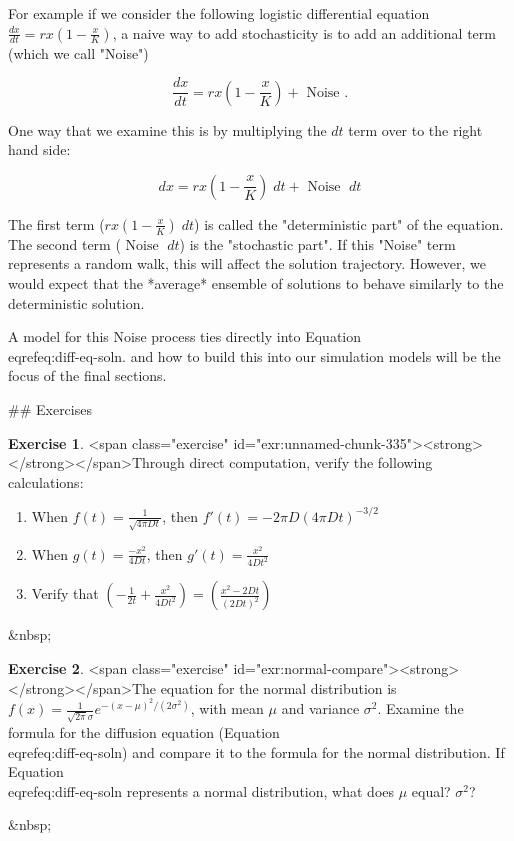 \documentclass[
]{book}
\theoremstyle{definition}
\theoremstyle{definition}
\theoremstyle{definition}
\newtheorem{exercise}{Exercise}[chapter]
\theoremstyle{remark}
\begin{document}
For example if we consider the following logistic differential equation $\displaystyle \frac{dx}{dt} = rx \left(1-\frac{x}{K} \right)$, a naive way to add stochasticity is to add an additional term (which we call "Noise")

\begin{equation}
\frac{dx}{dt} = rx \left(1-\frac{x}{K} \right) + \mbox{ Noise }.
\end{equation}

One way that we examine this is by multiplying the $dt$ term over to the right hand side:

\begin{equation}
dx = rx \left(1-\frac{x}{K} \right) \; dt + \mbox{ Noise } \; dt
\end{equation}

The first term ($\displaystyle rx \left(1-\frac{x}{K} \right) \; dt$) is called the "deterministic part" of the equation.  The second term ($\mbox{ Noise } \; dt$) is the "stochastic part".  If this "Noise" term represents a random walk, this will affect the solution trajectory.  However, we would expect that the *average* ensemble of solutions to behave similarly to the deterministic solution.


A model for this Noise process ties directly into Equation \\eqref{eq:diff-eq-soln}.  and how to build this into our simulation models will be the focus of the final sections.

\newpage

## Exercises
\begin{exercise}
<span class="exercise" id="exr:unnamed-chunk-335"><strong>\label{exr:unnamed-chunk-335} </strong></span>Through direct computation, verify the following calculations:
  \begin{enumerate}[label=\alph*.]
\item When $\displaystyle f(t)=\frac{1}{\sqrt{4 \pi Dt} }$, then $\displaystyle f'(t)=-2\pi D (4 \pi D t)^{-3/2}$
\item When $\displaystyle g(t)=\frac{-x^{2}}{4Dt}$, then $\displaystyle g'(t)=\frac{x^{2}}{4Dt^{2}}$
\item Verify that $\displaystyle \left( -\frac{1}{2t} +  \frac{x^{2}}{4Dt^{2}} \right)= \left( \frac{x^{2}-2Dt}{(2Dt)^{2}}\right)$
\end{enumerate}
\end{exercise}
&nbsp;
\begin{exercise}
<span class="exercise" id="exr:normal-compare"><strong>\label{exr:normal-compare} </strong></span>The equation for the normal distribution is $\displaystyle f(x)=\frac{1}{\sqrt{2 \pi} \sigma } e^{-(x-\mu)^{2}/(2 \sigma^{2})}$, with mean $\mu$ and variance $\sigma^{2}$. Examine the formula for the diffusion equation (Equation \\eqref{eq:diff-eq-soln}) and compare it to the formula for the normal distribution. If Equation \\eqref{eq:diff-eq-soln} represents a normal distribution, what does $\mu$ equal?  $\sigma^{2}$?
\end{exercise}
&nbsp;
\end{document}
